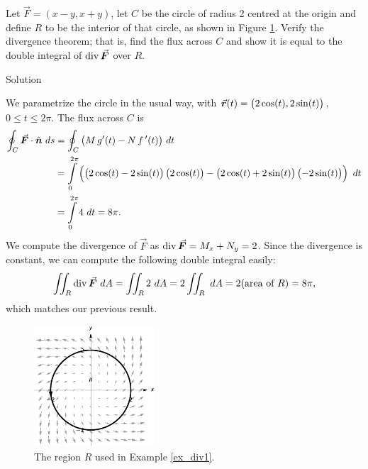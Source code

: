 \begin{example}
\label{ex_div1}
Let $\vec F = \left( x-y,x+y\right)$, let $C$ be the circle of radius 2 centred at the origin and define $R$ to be the interior of that circle, as shown in Figure \ref{fig_Vector_Calc_17}. Verify the divergence theorem; that is, find the flux across $C$ and show it is equal to the double integral of $\divv \vec F$ over $R$.




Solution 

We parametrize the circle in the usual way, with $\vrt =\left( 2\cos (t),2\sin (t) \right)$, $0\leq t\leq 2\pi$. The flux across $C$ is
\begin{align*}
\oint_C \vec F\cdot \hat n\ ds &= \oint_C\big(M\,g'(t)-N\, \fp(t)\big)\ dt\\ &= \int\limits_0^{2\pi} \left(\left(2\cos (t)-2\sin (t)\right)\left(2\cos (t)\right) - \left(2\cos (t)+2\sin (t)\right)\left(-2\sin (t)\right)\right)\ dt\\
		&= \int\limits_0^{2\pi} 4\ dt = 8\pi.
\end{align*}
We compute the divergence of $\vec F$ as $\divv \vec F = M_x+N_y = 2$. Since the divergence is constant, we can compute the following double integral easily:
$$\iint_R \divv \vec F\ dA = \iint_R 2\ dA = 2\iint_R\ dA = 2(\text{area of $R$}) = 8\pi,$$
which matches our previous result.

\begin{figure}[H]
	\begin{center}
			\includegraphics[width=0.4\textwidth]{fig_Vector_Calc_17}
	\caption{The region $R$ used in Example \ref{ex_div1}.}
	\label{fig_Vector_Calc_17}
	\end{center}
\end{figure}
\end{example}


